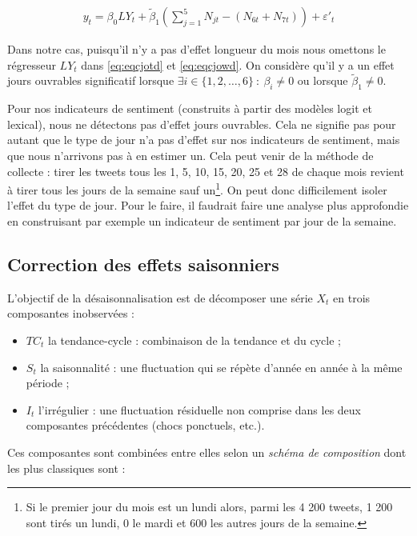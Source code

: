 \documentclass[11pt,french,french]{article}
\let\rmarkdownfootnote\footnote%
\def\footnote{\protect\rmarkdownfootnote}
\begin{document}
\begin{eqnarray}
y_t=\beta_0 LY_t + \tilde\beta_1 \left(\sum_{j=1}^{5}N_{jt} - (N_{6t} + N_{7t})\right) + \varepsilon'_t
\label{eq:eqcjowd}
\end{eqnarray}

Dans notre cas, puisqu'il n'y a pas d'effet longueur du mois nous
omettons le régresseur \(LY_t\) dans \eqref{eq:eqcjotd} et
\eqref{eq:eqcjowd}. On considère qu'il y a un effet jours ouvrables
significatif lorsque \(\exists i\in \{1,2,\dots,6\}\::\:\beta_i\ne0\) ou
lorsque \(\tilde\beta_1\ne0\).

\faArrowCircleRight{} Pour nos indicateurs de sentiment (construits à
partir des modèles logit et lexical), nous ne détectons pas d'effet
jours ouvrables. Cela ne signifie pas pour autant que le type de jour
n'a pas d'effet sur nos indicateurs de sentiment, mais que nous
n'arrivons pas à en estimer un. Cela peut venir de la méthode de
collecte : tirer les tweets tous les 1, 5, 10, 15, 20, 25 et 28 de
chaque mois revient à tirer tous les jours de la semaine sauf
un\footnote{Si le premier jour du mois est un lundi alors, parmi les 4
  200 tweets, 1 200 sont tirés un lundi, 0 le mardi et 600 les autres
  jours de la semaine.}. On peut donc difficilement isoler l'effet du
type de jour. Pour le faire, il faudrait faire une analyse plus
approfondie en construisant par exemple un indicateur de sentiment par
jour de la semaine.

\subsection{Correction des effets saisonniers}\label{sec:cvs}

L'objectif de la désaisonnalisation est de décomposer une série \(X_t\)
en trois composantes inobservées :

\begin{itemize}
\item
  \(TC_t\) la tendance-cycle : combinaison de la tendance et du cycle ;
\item
  \(S_t\) la saisonnalité : une fluctuation qui se répète d'année en
  année à la même période ;
\item
  \(I_t\) l'irrégulier : une fluctuation résiduelle non comprise dans
  les deux composantes précédentes (chocs ponctuels, etc.).
\end{itemize}

Ces composantes sont combinées entre elles selon un \emph{schéma de
composition} dont les plus classiques sont :
\end{document}
